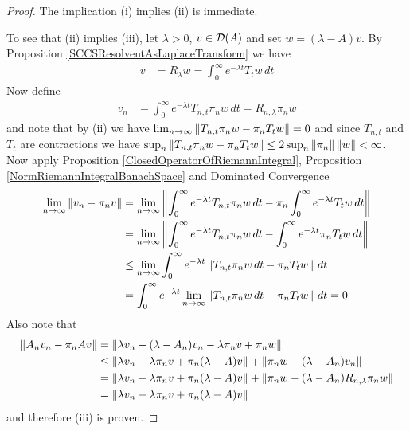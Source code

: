 \begin{proof}
The implication (i) implies (ii) is immediate.

To see that (ii) implies (iii), let $\lambda > 0$, $v \in \mathcal{D}(A)$ and set $w = (\lambda - A) v$.  By Proposition \ref{SCCSResolventAsLaplaceTransform} we have
\begin{align*}
v &= R_\lambda w = \int_0^\infty e^{- \lambda t} T_t w \, dt
\end{align*}
Now define
\begin{align*}
v_n &= \int_0^\infty e^{- \lambda t} T_{n,t} \pi_n w \, dt = R_{n,\lambda} \pi_n w
\end{align*}
and note that by (ii) we have $\lim_{n \to \infty} \left \lVert T_{n,t} \pi_n w - \pi_n T_t w \right \rVert = 0$ and since $T_{n,t}$ and $T_t$ are contractions we have $\sup_n \left \lVert T_{n,t} \pi_n w - \pi_n T_t w \right \rVert \leq 2 \sup_n \left \lVert \pi_n \right \rVert \left \lVert w \right \rVert < \infty$. Now apply Proposition \ref{ClosedOperatorOfRiemannIntegral}, Proposition \ref{NormRiemannIntegralBanachSpace} and Dominated Convergence
\begin{align*}
\lim_{n \to \infty} \left \lVert v_n - \pi_n v \right \rVert &= \lim_{n \to \infty} \left \lVert \int_0^\infty e^{- \lambda t} T_{n,t} \pi_n w \, dt - \pi_n \int_0^\infty e^{- \lambda t} T_t w \, dt \right \rVert \\
&= \lim_{n \to \infty} \left \lVert \int_0^\infty e^{- \lambda t} T_{n,t} \pi_n w \, dt - \int_0^\infty e^{- \lambda t} \pi_n  T_t w \, dt \right \rVert \\
&\leq \lim_{n \to \infty} \int_0^\infty e^{- \lambda t} \left \lVert T_{n,t} \pi_n w \, dt - \pi_n  T_t w \right \rVert \, dt \\
&= \int_0^\infty e^{- \lambda t} \lim_{n \to \infty} \left \lVert T_{n,t} \pi_n w \, dt - \pi_n  T_t w \right \rVert \, dt = 0\\
\end{align*}
Also note that
\begin{align*}
\left \lVert A_n v_n - \pi_n A v \right \rVert &= \left \lVert \lambda v_n - (\lambda - A_n) v_n - \lambda \pi_n v + \pi_n w \right \rVert \\
&\leq \left \lVert \lambda v_n - \lambda \pi_n v + \pi_n (\lambda - A) v \right \rVert + \left \lVert \pi_n w - (\lambda - A_n) v_n \right \rVert \\
&= \left \lVert \lambda v_n - \lambda \pi_n v + \pi_n (\lambda - A) v \right \rVert + \left \lVert \pi_n w - (\lambda - A_n) R_{n,\lambda} \pi_n w \right \rVert \\
&= \left \lVert \lambda v_n - \lambda \pi_n v + \pi_n (\lambda - A) v \right \rVert \\
\end{align*}
and therefore (iii) is proven.


\end{proof}
